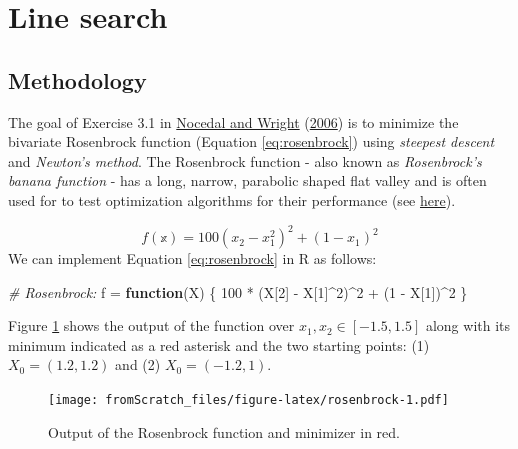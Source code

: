 \documentclass[
]{book}
\newenvironment{Shaded}{\begin{snugshade}}{\end{snugshade}}
\newcommand{\CommentTok}[1]{\textcolor[rgb]{0.56,0.35,0.01}{\textit{#1}}}
\newcommand{\ControlFlowTok}[1]{\textcolor[rgb]{0.13,0.29,0.53}{\textbf{#1}}}
\newcommand{\DecValTok}[1]{\textcolor[rgb]{0.00,0.00,0.81}{#1}}
\newcommand{\NormalTok}[1]{#1}
\newcommand{\OtherTok}[1]{\textcolor[rgb]{0.56,0.35,0.01}{#1}}
\newcommand{\SpecialCharTok}[1]{\textcolor[rgb]{0.00,0.00,0.00}{#1}}
\begin{document}
\hypertarget{line-search}{%
\section{Line search}\label{line-search}}

\hypertarget{methodology}{%
\subsection{Methodology}\label{methodology}}

The goal of Exercise 3.1 in \protect\hyperlink{ref-nw2006numerical}{Nocedal and Wright} (\protect\hyperlink{ref-nw2006numerical}{2006}) is to minimize the bivariate Rosenbrock function (Equation \eqref{eq:rosenbrock}) using \emph{steepest descent} and \emph{Newton's method}. The Rosenbrock function - also known as \emph{Rosenbrock's banana function} - has a long, narrow, parabolic shaped flat valley and is often used for to test optimization algorithms for their performance (see \href{https://en.wikipedia.org/wiki/Rosenbrock_function}{here}).

\[
\begin{equation}
  f(\mathbb{x})=100(x_2-x_1^2)^2+(1-x_1)^2 
  \label{eq:rosenbrock}
\end{equation}
\]
We can implement Equation \eqref{eq:rosenbrock} in R as follows:

\begin{Shaded}
\begin{Highlighting}[]
\CommentTok{\# Rosenbrock:}
\NormalTok{f }\OtherTok{=} \ControlFlowTok{function}\NormalTok{(X) \{}
  \DecValTok{100} \SpecialCharTok{*}\NormalTok{ (X[}\DecValTok{2}\NormalTok{] }\SpecialCharTok{{-}}\NormalTok{ X[}\DecValTok{1}\NormalTok{]}\SpecialCharTok{\^{}}\DecValTok{2}\NormalTok{)}\SpecialCharTok{\^{}}\DecValTok{2} \SpecialCharTok{+}\NormalTok{ (}\DecValTok{1} \SpecialCharTok{{-}}\NormalTok{ X[}\DecValTok{1}\NormalTok{])}\SpecialCharTok{\^{}}\DecValTok{2}
\NormalTok{\}}
\end{Highlighting}
\end{Shaded}

Figure \ref{fig:rosenbrock} shows the output of the function over \(x_1,x_2 \in [-1.5, 1.5]\) along with its minimum indicated as a red asterisk and the two starting points: (1) \(X_0=(1.2,1.2)\) and (2) \(X_0=(-1.2,1)\).

\begin{figure}
\centering
\texttt{[image: fromScratch\_files/figure-latex/rosenbrock-1.pdf]}
\caption{\label{fig:rosenbrock}Output of the Rosenbrock function and minimizer in red.}
\end{figure}
\end{document}
